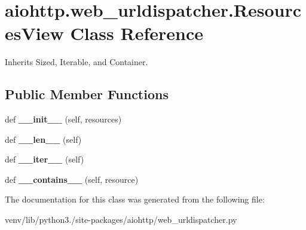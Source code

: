 \hypertarget{classaiohttp_1_1web__urldispatcher_1_1_resources_view}{}\section{aiohttp.\+web\+\_\+urldispatcher.\+Resources\+View Class Reference}
\label{classaiohttp_1_1web__urldispatcher_1_1_resources_view}


Inherits Sized, Iterable, and Container.

\subsection*{Public Member Functions}
\begin{DoxyCompactItemize}
\item 
\mbox{\label{classaiohttp_1_1web__urldispatcher_1_1_resources_view_af0f87a98a37e901c9675cd6375d14619}} 
def {\bfseries \+\_\+\+\_\+init\+\_\+\+\_\+} (self, resources)
\item 
\mbox{\label{classaiohttp_1_1web__urldispatcher_1_1_resources_view_a99e297dbd6ecb76bf7bf6eb84bc87ed0}} 
def {\bfseries \+\_\+\+\_\+len\+\_\+\+\_\+} (self)
\item 
\mbox{\label{classaiohttp_1_1web__urldispatcher_1_1_resources_view_a91bc19ef953cbc2822ac6ded1203dba1}} 
def {\bfseries \+\_\+\+\_\+iter\+\_\+\+\_\+} (self)
\item 
\mbox{\label{classaiohttp_1_1web__urldispatcher_1_1_resources_view_abd428986ede2bd0ee05dd2ace9d321f9}} 
def {\bfseries \+\_\+\+\_\+contains\+\_\+\+\_\+} (self, resource)
\end{DoxyCompactItemize}


The documentation for this class was generated from the following file\+:\begin{DoxyCompactItemize}
\item 
venv/lib/python3./site-\/packages/aiohttp/web\+\_\+urldispatcher.\+py\end{DoxyCompactItemize}
